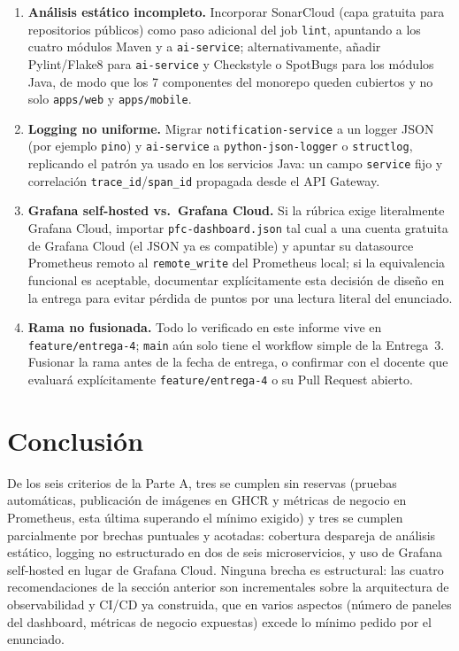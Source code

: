 \documentclass[11pt,letterpaper]{article}
\begin{document}
\begin{enumerate}[leftmargin=1.2em]
\item \textbf{Análisis estático incompleto.} Incorporar SonarCloud (capa gratuita para repositorios públicos) como paso adicional del job \texttt{lint}, apuntando a los cuatro módulos Maven y a \texttt{ai-service}; alternativamente, añadir Pylint/Flake8 para \texttt{ai-service} y Checkstyle o SpotBugs para los módulos Java, de modo que los 7 componentes del monorepo queden cubiertos y no solo \texttt{apps/web} y \texttt{apps/mobile}.
\item \textbf{Logging no uniforme.} Migrar \texttt{notification-service} a un logger JSON (por ejemplo \texttt{pino}) y \texttt{ai-service} a \texttt{python-json-logger} o \texttt{structlog}, replicando el patrón ya usado en los servicios Java: un campo \texttt{service} fijo y correlación \texttt{trace\_id}/\texttt{span\_id} propagada desde el API Gateway.
\item \textbf{Grafana self-hosted vs.\ Grafana Cloud.} Si la rúbrica exige literalmente Grafana Cloud, importar \texttt{pfc-dashboard.json} tal cual a una cuenta gratuita de Grafana Cloud (el JSON ya es compatible) y apuntar su datasource Prometheus remoto al \texttt{remote\_write} del Prometheus local; si la equivalencia funcional es aceptable, documentar explícitamente esta decisión de diseño en la entrega para evitar pérdida de puntos por una lectura literal del enunciado.
\item \textbf{Rama no fusionada.} Todo lo verificado en este informe vive en \texttt{feature/entrega-4}; \texttt{main} aún solo tiene el workflow simple de la Entrega~3. Fusionar la rama antes de la fecha de entrega, o confirmar con el docente que evaluará explícitamente \texttt{feature/entrega-4} o su Pull Request abierto.
\end{enumerate}

\section{Conclusión}

De los seis criterios de la Parte A, tres se cumplen sin reservas (pruebas automáticas, publicación de imágenes en GHCR y métricas de negocio en Prometheus, esta última superando el mínimo exigido) y tres se cumplen parcialmente por brechas puntuales y acotadas: cobertura despareja de análisis estático, logging no estructurado en dos de seis microservicios, y uso de Grafana self-hosted en lugar de Grafana Cloud. Ninguna brecha es estructural: las cuatro recomendaciones de la sección anterior son incrementales sobre la arquitectura de observabilidad y CI/CD ya construida, que en varios aspectos (número de paneles del dashboard, métricas de negocio expuestas) excede lo mínimo pedido por el enunciado.



\end{document}
